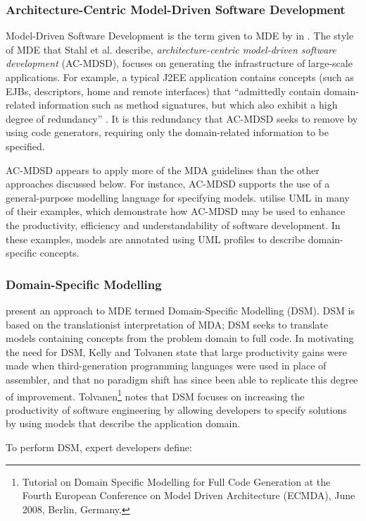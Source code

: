 \subsubsection{Architecture-Centric Model-Driven Software Development}
Model-Driven Software Development is the term given to MDE by in \cite{stahl06mdsd}. The style of MDE that Stahl et al. describe, \textit{architecture-centric model-driven software development} (AC-MDSD), focuses on generating the infrastructure of large-scale applications. For example, a typical J2EE application contains concepts (such as EJBs, descriptors, home and remote interfaces) that ``admittedly contain domain-related information such as method signatures, but which also exhibit a high degree of redundancy'' \cite{stahl06mdsd}. It is this redundancy that AC-MDSD seeks to remove by using code generators, requiring only the domain-related information to be specified.

AC-MDSD appears to apply more of the MDA guidelines than the other approaches discussed below. For instance, AC-MDSD supports the use of a general-purpose modelling language for specifying models. \cite{stahl06mdsd} utilise UML in many of their examples, which demonstrate how AC-MDSD may be used to enhance the productivity, efficiency and understandability of software development. In these examples, models are annotated using UML profiles to describe domain-specific concepts.


\subsubsection{Domain-Specific Modelling}
\cite{kelly08dsm} present an approach to MDE termed Domain-Specific Modelling (DSM). DSM is based on the translationist interpretation of MDA; DSM seeks to translate models containing concepts from the problem domain to full code. In motivating the need for DSM, Kelly and Tolvanen state that large productivity gains were made when third-generation programming languages were used in place of assembler, and that no paradigm shift has since been able to replicate this degree of improvement. Tolvanen\footnote{Tutorial on Domain Specific Modelling for Full Code Generation at the Fourth European Conference on Model Driven Architecture (ECMDA), June 2008, Berlin, Germany.} notes that DSM focuses on increasing the productivity of software engineering by allowing developers to specify solutions by using models that describe the application domain.

To perform DSM, expert developers define:

